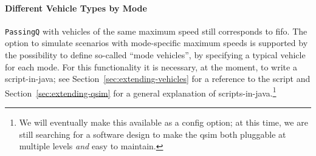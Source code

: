 \paragraph{Different Vehicle Types by Mode}
\lstinline|PassingQ| with vehicles of the same maximum speed still corresponds to \gls{fifo}. 
The option to simulate scenarios with 
mode-specific maximum speeds is supported by the possibility to define so-called ``mode vehicles'', \ie by specifying a typical vehicle for each mode.
%
%  
%
%
%
%
For this functionality it is necessary, at the moment, to write a script-in-\gls{java}; see Section~\ref{sec:extending-vehicles} for a reference to the script and Section~\ref{sec:extending-qsim} for a general explanation of scripts-in-\gls{java}.\footnote{We will eventually make this available as a config option; at this time, we are still searching for a software design to make the \gls{qsim} both pluggable at multiple levels \emph{and} easy to maintain.}


